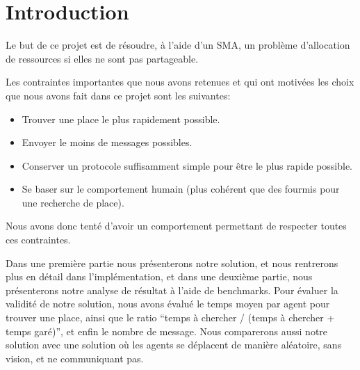 
\section*{Introduction}
\label{sec:intro}

Le but de ce projet est de résoudre, à l'aide d'un SMA, un problème
d'allocation de ressources si elles ne sont pas partageable.

Les contraintes importantes que nous avons retenues et qui ont
motivées les choix que nous avons fait dans ce projet sont les
suivantes:

\begin{itemize}
\item Trouver une place le plus rapidement possible.
\item Envoyer le moins de messages possibles.
\item Conserver un protocole suffisamment simple pour être le plus
  rapide possible.
\item Se baser sur le comportement humain (plus cohérent que des
  fourmis pour une recherche de place).
\end{itemize}

Nous avons donc tenté d'avoir un comportement permettant de respecter
toutes ces contraintes.

Dans une première partie nous présenterons notre solution, et nous
rentrerons plus en détail dans l'implémentation, et dans une deuxième
partie, nous présenterons notre analyse de résultat à l'aide de
benchmarks. Pour évaluer la validité de notre solution, nous avons
évalué le temps moyen par agent pour trouver une place, ainsi que le
ratio ``temps à chercher / (temps à chercher + temps garé)'', et enfin
le nombre de message. Nous comparerons aussi notre solution avec une
solution où les agents se déplacent de manière aléatoire, sans vision,
et ne communiquant pas.

